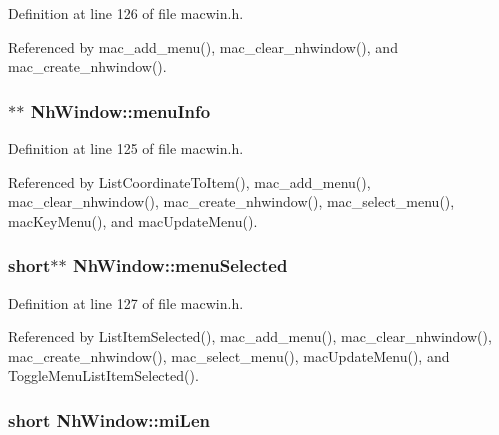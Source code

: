 Definition at line 126 of file macwin.\+h.



Referenced by mac\+\_\+add\+\_\+menu(), mac\+\_\+clear\+\_\+nhwindow(), and mac\+\_\+create\+\_\+nhwindow().

\hypertarget{structNhWindow_a89047d040986f9093c06241a64f5c6ee}{
\subsubsection[{menu\+Info}]{$\ast$$\ast$ Nh\+Window\+::menu\+Info}}\label{structNhWindow_a89047d040986f9093c06241a64f5c6ee}


Definition at line 125 of file macwin.\+h.



Referenced by List\+Coordinate\+To\+Item(), mac\+\_\+add\+\_\+menu(), mac\+\_\+clear\+\_\+nhwindow(), mac\+\_\+create\+\_\+nhwindow(), mac\+\_\+select\+\_\+menu(), mac\+Key\+Menu(), and mac\+Update\+Menu().

\hypertarget{structNhWindow_af71d68bfa21e395133a3df5ad7d16a5b}{
\subsubsection[{menu\+Selected}]{\setlength{\rightskip}{0pt plus 5cm}short$\ast$$\ast$ Nh\+Window\+::menu\+Selected}}\label{structNhWindow_af71d68bfa21e395133a3df5ad7d16a5b}


Definition at line 127 of file macwin.\+h.



Referenced by List\+Item\+Selected(), mac\+\_\+add\+\_\+menu(), mac\+\_\+clear\+\_\+nhwindow(), mac\+\_\+create\+\_\+nhwindow(), mac\+\_\+select\+\_\+menu(), mac\+Update\+Menu(), and Toggle\+Menu\+List\+Item\+Selected().

\hypertarget{structNhWindow_ad3a28bda1cad1fb265f19d598da63cf5}{
\subsubsection[{mi\+Len}]{\setlength{\rightskip}{0pt plus 5cm}short Nh\+Window\+::mi\+Len}}\label{structNhWindow_ad3a28bda1cad1fb265f19d598da63cf5}


